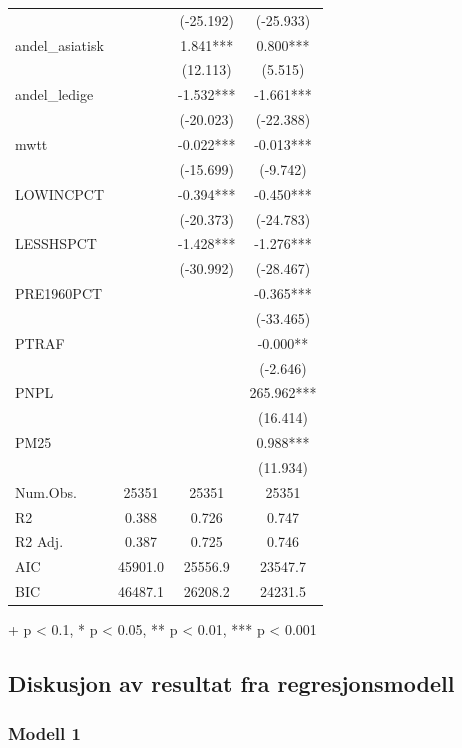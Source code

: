 \documentclass[
  norsk,
  a4paper,
]{article}
\begin{document}
\begin{table}
\begin{tabular*}{\linewidth}{@{\extracolsep{\fill}}lccc}
 &  & (-25.192) & (-25.933) \\ 
andel\_asiatisk &  & 1.841*** & 0.800*** \\ 
 &  & (12.113) & (5.515) \\ 
andel\_ledige &  & -1.532*** & -1.661*** \\ 
 &  & (-20.023) & (-22.388) \\ 
mwtt &  & -0.022*** & -0.013*** \\ 
 &  & (-15.699) & (-9.742) \\ 
LOWINCPCT &  & -0.394*** & -0.450*** \\ 
 &  & (-20.373) & (-24.783) \\ 
LESSHSPCT &  & -1.428*** & -1.276*** \\ 
 &  & (-30.992) & (-28.467) \\ 
PRE1960PCT &  &  & -0.365*** \\ 
 &  &  & (-33.465) \\ 
PTRAF &  &  & -0.000** \\ 
 &  &  & (-2.646) \\ 
PNPL &  &  & 265.962*** \\ 
 &  &  & (16.414) \\ 
PM25 &  &  & 0.988*** \\ 
{} & {} & {} & {(11.934)} \\ 
Num.Obs. & 25351 & 25351 & 25351 \\ 
R2 & 0.388 & 0.726 & 0.747 \\ 
R2 Adj. & 0.387 & 0.725 & 0.746 \\ 
AIC & 45901.0 & 25556.9 & 23547.7 \\ 
BIC & 46487.1 & 26208.2 & 24231.5 \\ 
\bottomrule
\end{tabular*}
\begin{minipage}{\linewidth}
\vspace{.05em}
+ p < 0.1, * p < 0.05, ** p < 0.01, *** p < 0.001\\
\end{minipage}
\end{table}

\subsection{Diskusjon av resultat fra
regresjonsmodell}\label{diskusjon-av-resultat-fra-regresjonsmodell}

\subsubsection{Modell 1}\label{modell-1-1}
\end{document}
